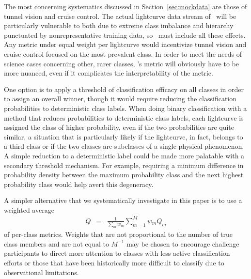 The most concerning systematics discussed in Section~\ref{sec:mockdata} are those of tunnel vision and cruise control.
The actual lightcurve data stream of \lsst\ will be particularly vulnerable to both due to extreme class imbalance and hierarchy punctuated by nonrepresentative training data, so \plasticc\ must include all these effects.
Any metric under equal weight per lightcurve would incentivize tunnel vision and cruise control focused on the most prevalent class.
In order to meet the needs of science cases concerning other, rarer classes, \plasticc's metric will obviously have to be more nuanced, even if it complicates the interpretability of the metric.

One option is to apply a threshold of classification efficacy on all classes in order to assign an overall winner, though it would require reducing the classification probabilities to deterministic class labels.
When doing binary classification with a method that reduces probabilities to deterministic class labels, each lightcurve is assigned the class of higher probability, even if the two probabilities are quite similar, a situation that is particularly likely if the lightcurve, in fact, belongs to a third class or if the two classes are subclasses of a single physical phenomenon.
A simple reduction to a deterministic label could be made more palatable with a secondary threshold mechanism.
For example, requiring a minimum difference in probability density between the maximum probability class and the next highest probability class would help avert this degeneracy.

A simpler alternative that we systematically investigate in this paper is to use a weighted average
\begin{eqnarray}
  \label{eq:weightavg}
  Q &=& \frac{1}{\sum_{m} w_{m}} \sum_{m=1}^{M} w_{m} Q_{m}
\end{eqnarray}
of per-class metrics.
Weights that are not proportional to the number of true class members and are not equal to $M^{-1}$ may be chosen to encourage challenge participants to direct more attention to classes with less active classification efforts or those that have been historically more difficult to classify due to observational limitations.

